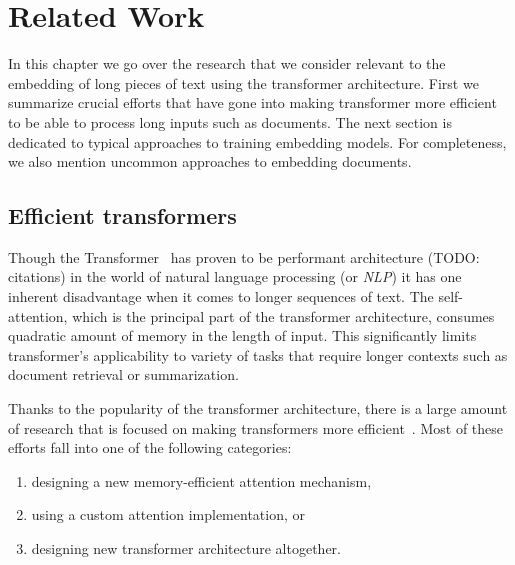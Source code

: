 \chapter{Related Work}


In this chapter we go over the research that we consider relevant to the
embedding of long pieces of text using the transformer architecture. First we
summarize crucial efforts that have gone into making transformer more efficient
to be able to process long inputs such as documents. The next section is
dedicated to typical approaches to training embedding models. For completeness,
we also mention uncommon approaches to embedding documents.

\section{Efficient transformers}


Though the Transformer~\cite{vaswani2017attention} has proven to be performant
architecture (TODO: citations) in the world of natural language processing (or
\emph{NLP}) it has one inherent disadvantage when it comes to longer sequences
of text. The self-attention, which is the principal part of the transformer
architecture, consumes quadratic amount of memory in the length of input. This
significantly limits transformer's applicability to variety of tasks that
require longer contexts such as document retrieval or summarization.

Thanks to the popularity of the transformer architecture, there is a large
amount of research that is focused on making transformers more
efficient~\cite{tay2022efficient}. Most of these efforts fall into one of the
following categories:

\begin{enumerate}

    \item designing a new memory-efficient attention mechanism,

    \item using a custom attention implementation, or

    \item designing new transformer architecture altogether.

\end{enumerate}

